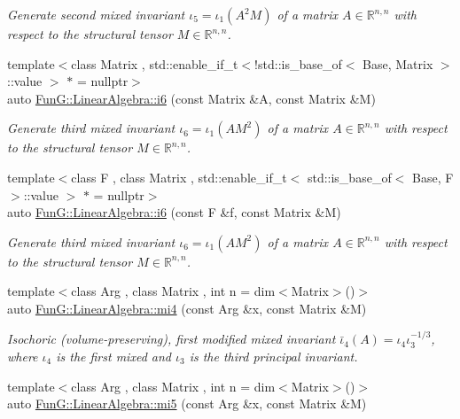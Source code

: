 \begin{DoxyCompactItemize}
\begin{DoxyCompactList}\small\item\em Generate second mixed invariant $ \iota_5=\iota_1(A^2M) $ of a matrix $A\in\mathbb{R}^{n,n}$ with respect to the structural tensor $M\in\mathbb{R}^{n,n}$. \end{DoxyCompactList}\item 
{\footnotesize template$<$class Matrix , std\-::enable\-\_\-if\-\_\-t$<$!std\-::is\-\_\-base\-\_\-of$<$ Base, Matrix $>$\-::value $>$ $\ast$  = nullptr$>$ }\\auto \hyperlink{group__InvariantGroup_gad9f0627946667bb052212f65ecdd002b}{Fun\-G\-::\-Linear\-Algebra\-::i6} (const Matrix \&A, const Matrix \&M)
\begin{DoxyCompactList}\small\item\em Generate third mixed invariant $ \iota_6=\iota_1(AM^2) $ of a matrix $A\in\mathbb{R}^{n,n}$ with respect to the structural tensor $M\in\mathbb{R}^{n,n}$. \end{DoxyCompactList}\item 
{\footnotesize template$<$class F , class Matrix , std\-::enable\-\_\-if\-\_\-t$<$ std\-::is\-\_\-base\-\_\-of$<$ Base, F $>$\-::value $>$ $\ast$  = nullptr$>$ }\\auto \hyperlink{group__InvariantGroup_ga2536c80df733bb3e089487202c3688c1}{Fun\-G\-::\-Linear\-Algebra\-::i6} (const F \&f, const Matrix \&M)
\begin{DoxyCompactList}\small\item\em Generate third mixed invariant $ \iota_6=\iota_1(AM^2) $ of a matrix $A\in\mathbb{R}^{n,n}$ with respect to the structural tensor $M\in\mathbb{R}^{n,n}$. \end{DoxyCompactList}\item 
{\footnotesize template$<$class Arg , class Matrix , int n = dim$<$\-Matrix$>$()$>$ }\\auto \hyperlink{group__InvariantGroup_ga7ee54c5d056877bdefefb8e54ad17791}{Fun\-G\-::\-Linear\-Algebra\-::mi4} (const Arg \&x, const Matrix \&M)
\begin{DoxyCompactList}\small\item\em Isochoric (volume-\/preserving), first modified mixed invariant $ \bar\iota_4(A)=\iota_4\iota_3^{-1/3} $, where $\iota_4$ is the first mixed and $\iota_3$ is the third principal invariant. \end{DoxyCompactList}\item 
{\footnotesize template$<$class Arg , class Matrix , int n = dim$<$\-Matrix$>$()$>$ }\\auto \hyperlink{group__InvariantGroup_ga189bc682b34d13902da335c5eb502faa}{Fun\-G\-::\-Linear\-Algebra\-::mi5} (const Arg \&x, const Matrix \&M)

\end{DoxyCompactItemize}
